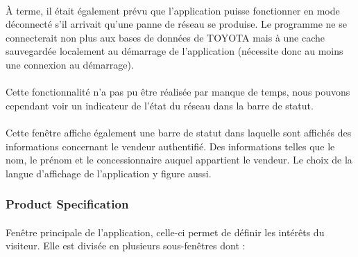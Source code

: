 \documentclass[12pt]{report}
\begin{document}
\paragraph{}
À terme, il était également prévu que l'application puisse fonctionner en mode déconnecté s'il arrivait qu'une panne de réseau se produise. Le programme ne se connecterait non plus aux bases de données de TOYOTA mais à une cache sauvegardée localement au démarrage de l'application (nécessite donc au moins une connexion au démarrage).
\paragraph{}
Cette fonctionnalité n'a pas pu être réalisée par manque de temps, nous pouvons cependant voir un indicateur de l'état du réseau dans la barre de statut.
\paragraph{}
Cette fenêtre affiche également une barre de statut dans laquelle sont affichés des informations concernant le vendeur authentifié. Des informations telles que le nom, le prénom et le concessionnaire auquel appartient le vendeur. 
Le choix de la langue d'affichage de l'application y figure aussi.

\subsubsection*{Product Specification}
\paragraph{}
Fenêtre principale de l'application, celle-ci permet de définir les intérêts du visiteur. Elle est divisée en plusieurs sous-fenêtres dont : 
\end{document}
